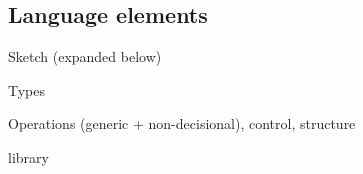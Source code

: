 \subsection{Language elements}\label{section: ola-lang-language-elements}

Sketch (expanded below)

Types

Operations (generic + non-decisional), control, structure

library
